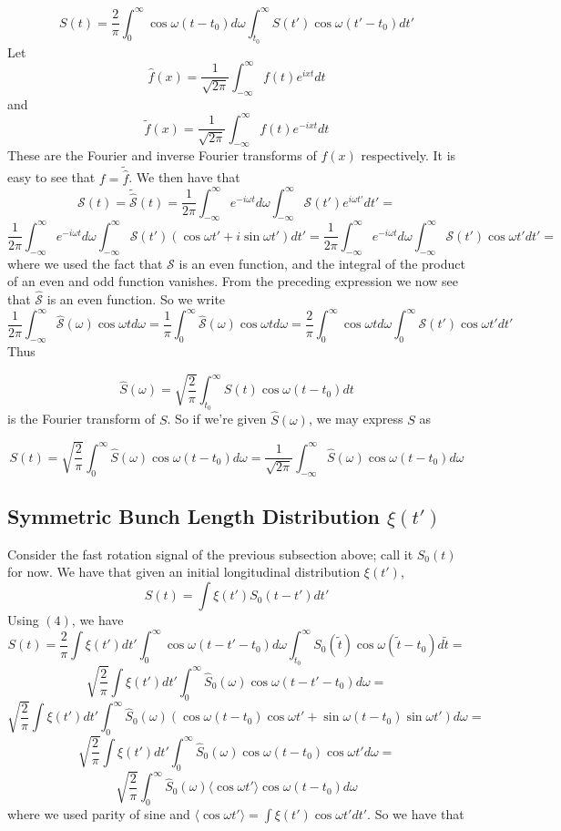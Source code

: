 \begin{equation}
S(t)=\frac{2}{\pi}\int^{\infty}_0\cos\omega(t-t_0)d\omega\int^{\infty}_{t_0}S(t')\cos\omega(t'-t_0)dt'
\end{equation} 
Let \[\hat{f}(x)=\frac{1}{\sqrt{2\pi}}\int^{\infty}_{-\infty}f(t)e^{ixt}dt\] and \[\tilde{f}(x)=\frac{1}{\sqrt{2\pi}}\int^{\infty}_{-\infty}f(t)e^{-ixt}dt\] These are the Fourier and inverse Fourier transforms of $f(x)$ respectively. It is easy to see that $f=\tilde{\hat{f}}$. We then have that \[\mathcal{S}(t)=\tilde{\hat{\mathcal{S}}}(t)=\frac{1}{2\pi}\int^{\infty}_{-\infty}e^{-i\omega t}d\omega\int^{\infty}_{-\infty}\mathcal{S}(t')e^{i\omega t'}dt'=\]\[\frac{1}{2\pi}\int^{\infty}_{-\infty}e^{-i\omega t}d\omega\int^{\infty}_{-\infty}\mathcal{S}(t')(\cos\omega t'+i\sin\omega t')dt'=\frac{1}{2\pi}\int^{\infty}_{-\infty}e^{-i\omega t}d\omega\int^{\infty}_{-\infty}\mathcal{S}(t')\cos\omega t'dt'=\] where we used the fact that $\mathcal{S}$ is an even function, and the integral of the product of an even and odd function vanishes. From the preceding expression we now see that $\hat{\mathcal{S}}$ is an even function. So we write \[\frac{1}{2\pi}\int^{\infty}_{-\infty}\hat{\mathcal{S}}(\omega)\cos\omega td\omega=\frac{1}{\pi}\int^{\infty}_0\hat{\mathcal{S}}(\omega)\cos\omega td\omega=\frac{2}{\pi}\int^{\infty}_0\cos\omega td\omega\int^{\infty}_0\mathcal{S}(t')\cos\omega t'dt'\] Thus 

\begin{equation}
\hat{S}(\omega)=\sqrt{\frac{2}{\pi}}\int^{\infty}_{t_0}S(t)\cos\omega(t-t_0)dt
\end{equation} 
is the Fourier transform of $S$. So if we're given $\hat{S}(\omega)$, we may express $S$ as 

\begin{equation}
S(t)=\sqrt{\frac{2}{\pi}}\int^{\infty}_0\hat{S}(\omega)\cos\omega(t-t_0)d\omega=\frac{1}{\sqrt{2\pi}}\int^{\infty}_{-\infty}\hat{S}(\omega)\cos\omega(t-t_0)d\omega
\end{equation}

\subsection{Symmetric Bunch Length Distribution $\xi(t')$}
Consider the fast rotation signal of the previous subsection above; call it $S_0(t)$ for now. We have that given an initial longitudinal distribution $\xi(t')$, \[S(t)=\int\xi(t')S_0(t-t')dt'\] Using $(4)$, we have \[S(t)=\frac{2}{\pi}\int\xi(t')dt'\int^{\infty}_0\cos\omega(t-t'-t_0)d\omega\int^{\infty}_{t_0}S_0(\tilde{t})\cos\omega(\tilde{t}-t_0)d\tilde{t}=\]\[\sqrt{\frac{2}{\pi}}\int\xi(t')dt'\int^{\infty}_0\hat{S}_0(\omega)\cos\omega(t-t'-t_0)d\omega=\]\[\sqrt{\frac{2}{\pi}}\int\xi(t')dt'\int^{\infty}_0\hat{S}_0(\omega)(\cos\omega(t-t_0)\cos\omega t'+\sin\omega(t-t_0)\sin\omega t')d\omega=\]\[\sqrt{\frac{2}{\pi}}\int\xi(t')dt'\int^{\infty}_0\hat{S}_0(\omega)\cos\omega(t-t_0)\cos\omega t'd\omega=\]\[\sqrt{\frac{2}{\pi}}\int^{\infty}_0\hat{S}_0(\omega)\langle\cos\omega t'\rangle\cos\omega(t-t_0)d\omega\] where we used parity of sine and $\langle\cos\omega t'\rangle=\int\xi(t')\cos\omega t'dt'$. So we have that 

